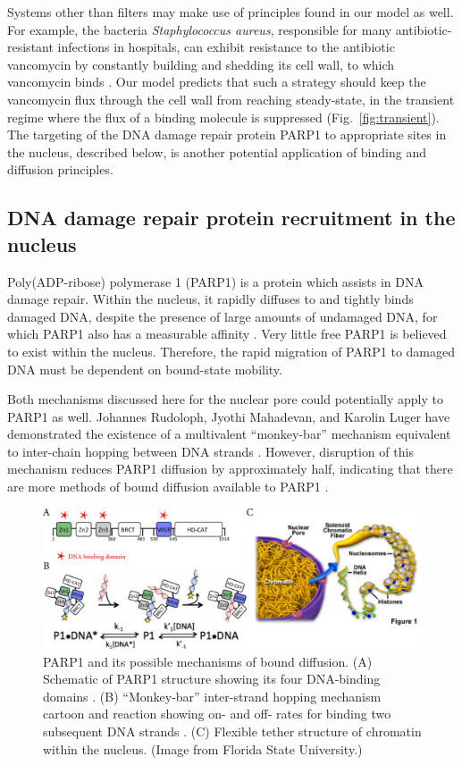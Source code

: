 Systems other than filters may make use of principles found in our model as well.  For example, the bacteria \textit{Staphylococcus aureus}, responsible for many antibiotic-resistant infections in hospitals, can exhibit resistance to the antibiotic vancomycin by constantly building and shedding its cell wall, to which vancomycin binds \cite{mcguinness17}.  Our model predicts that such a strategy should keep the vancomycin flux through the cell wall from reaching steady-state, in the transient regime where the flux of a binding molecule is suppressed (Fig.~\ref{fig:transient}).  The targeting of the DNA damage repair protein PARP1 to appropriate sites in the nucleus, described below, is another potential application of binding and diffusion principles.

\subsection{DNA damage repair protein recruitment in the nucleus}
\label{sec:parp1}

Poly(ADP-ribose) polymerase 1 (PARP1) is a protein  which assists in DNA damage repair.  Within the nucleus, it rapidly diffuses to and tightly binds damaged DNA, despite the presence of large amounts of undamaged DNA, for which PARP1 also has a measurable affinity \cite{rudolph18,sukhanova16}.  Very little free PARP1 is believed to exist within the nucleus.  Therefore, the rapid migration of PARP1 to damaged DNA must be dependent on bound-state mobility.

Both mechanisms discussed here for the nuclear pore could potentially apply to PARP1 as well.  Johannes Rudoloph, Jyothi Mahadevan, and Karolin Luger have demonstrated the existence of a multivalent ``monkey-bar'' mechanism equivalent to inter-chain hopping between DNA strands \cite{rudolph18}.  However, disruption of this mechanism reduces PARP1 diffusion by approximately half, indicating that there are more methods of bound diffusion available to PARP1 \cite{mahadevan18}.

\begin{figure}
\centering
\includegraphics[width=\linewidth]{figs/ch02/PARP1.pdf}
\caption[Possible bound-diffusion mechanisms of PARP1.]{PARP1 and its possible mechanisms of bound diffusion. (A) Schematic of PARP1 structure showing its four DNA-binding domains \cite{rudolph18}. (B) ``Monkey-bar'' inter-strand hopping mechanism cartoon and reaction showing on- and off- rates for binding two subsequent DNA strands \cite{rudolph18}.  (C) Flexible tether structure of chromatin within the nucleus.  (Image from Florida State University.)}
\label{fig:parp1}
\end{figure}

